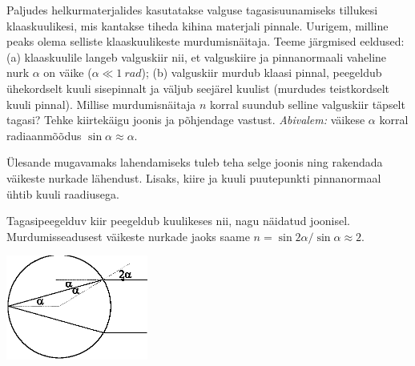 
Paljudes helkurmaterjalides kasutatakse valguse tagasisuunamiseks tillukesi
klaaskuulikesi, mis kantakse tiheda kihina materjali pinnale. Uurigem, milline
peaks olema selliste klaaskuulikeste murdumisnäitaja. Teeme järgmised eeldused:
(a) klaaskuulile langeb valguskiir nii, et valguskiire ja pinnanormaali vaheline
nurk $\alpha$ on väike ($\alpha \ll \SI{1}{rad}$); (b) valguskiir murdub klaasi
pinnal, peegeldub ühekordselt kuuli sisepinnalt ja väljub seejärel kuulist
(murdudes teistkordselt kuuli pinnal). Millise murdumisnäitaja $n$ korral
suundub selline valguskiir täpselt tagasi? Tehke kiirtekäigu joonis ja
põhjendage vastust. \emph{Abivalem:} väikese $\alpha$ korral radiaanmõõdus
$\sin\alpha \approx \alpha$.

\hint
Ülesande mugavamaks lahendamiseks tuleb teha selge joonis ning rakendada väikeste nurkade lähendust. Lisaks, kiire ja kuuli puutepunkti pinnanormaal ühtib kuuli raadiusega.

\solu
Tagasipeegelduv kiir peegeldub kuulikeses nii, nagu näidatud joonisel. Murdumisseadusest väikeste nurkade jaoks saame
$n=\sin 2\alpha/\sin\alpha \approx 2.$
\begin{center}
	\includegraphics[width=0.35\textwidth]{2010-lahg-04-kuulike.eps}
\end{center}
\probend